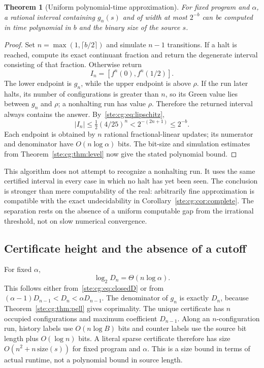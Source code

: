 \documentclass[11pt,letterpaper]{article}
\newtheorem{theorem}{Theorem}[section]
\theoremstyle{definition}
\theoremstyle{remark}
\begin{document}
\begin{theorem}[Uniform polynomial-time approximation]\label{ste:cg:thm:approx}
For fixed program and $\alpha$, a rational interval containing
$g_\alpha(s)$ and of width at most $2^{-b}$ can be computed in time
polynomial in $b$ and the binary size of the source $s$.
\end{theorem}
\begin{proof}
Set $n=\max(1,\lceil b/2\rceil)$ and simulate $n-1$ transitions. If a halt
is reached, compute its exact continuant fraction and return the degenerate
interval consisting of that fraction. Otherwise return
\begin{equation}\label{ste:cg:eq:interval}
 I_n=[f^n(0),f^n(1/2)].
\end{equation}
The lower endpoint is $g_n$, while the upper endpoint is above $\rho$.
If the run later halts, its number of configurations is greater than $n$,
so its Green value lies between $g_n$ and $\rho$; a nonhalting run has value
$\rho$. Therefore the returned interval always contains the answer.
By~\eqref{ste:cg:eq:lipschitz},
\[
 |I_n|\le\tfrac12(4/25)^n<2^{-(2n+1)}\le2^{-b}.
\]
Each endpoint is obtained by $n$ rational fractional-linear updates; its
numerator and denominator have $O(n\log\alpha)$ bits. The bit-size and
simulation estimates from Theorem~\ref{ste:cg:thm:level} now give the stated
polynomial bound.
\end{proof}

This algorithm does not attempt to recognize a nonhalting run. It uses the
same certified interval in every case in which no halt has yet been seen.
The conclusion is stronger than mere computability of the real: arbitrarily
fine approximation is compatible with the exact undecidability in
Corollary~\ref{ste:cg:cor:complete}. The separation rests on the absence of a
uniform computable gap from the irrational threshold, not on slow numerical
convergence.

\subsection{Certificate height and the absence of a cutoff}
For fixed $\alpha$,
\begin{equation}\label{ste:cg:eq:height}
 \log_2 D_n=\Theta(n\log\alpha).
\end{equation}
This follows either from~\eqref{ste:cg:eq:closedD} or from
$(\alpha-1)D_{n-1}<D_n<\alpha D_{n-1}$. The denominator of $g_n$ is
exactly $D_n$, because Theorem~\ref{ste:cg:thm:pell} gives coprimality. The unique
certificate has $n$ occupied configurations and maximum coefficient
$D_{n-1}$. Along an $n$-configuration run, history labels use $O(n\log B)$
bits and counter labels use the source bit length plus $O(\log n)$ bits.
A literal sparse certificate therefore has size
$O(n^2+n\,\mathrm{size}(s))$ for fixed program and $\alpha$.
This is a size bound in terms of actual runtime, not a polynomial bound in
source length.
\end{document}
